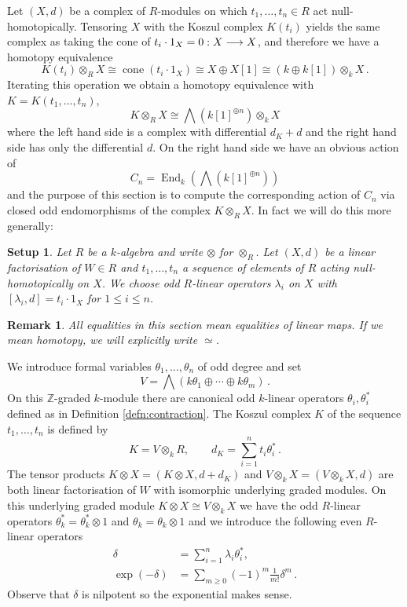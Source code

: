 \documentclass[english,letter paper,12pt,leqno]{article}
\newtheorem{setup}[theorem]{Setup}
\theoremstyle{example}
\newtheorem{remark}[theorem]{Remark}
\numberwithin{equation}{section}
\def\be{\begin{equation}}
\def\ee{\end{equation}}
\def\nZ{\mathds{Z}}
\DeclareMathOperator{\End}{End}
\begin{document}
Let $(X,d)$ be a complex of $R$-modules on which $t_1,\ldots,t_n \in R$ act null-homotopically. Tensoring $X$ with the Koszul complex $K(t_i)$ yields the same complex as taking the cone of $t_i \cdot 1_X = 0: X \longrightarrow X$, and therefore we have a homotopy equivalence
\be
K(t_i) \otimes_R X \cong \operatorname{cone}( t_i \cdot 1_X ) \cong X \oplus X[1] \cong ( k \oplus k[1] ) \otimes_k X\,.
\ee
Iterating this operation we obtain a homotopy equivalence with $K = K(t_1,\ldots,t_n)$,
\be\label{eq:cliffordactkos_1}
K \otimes_R X \cong \bigwedge( k[1]^{\oplus n} ) \otimes_k X
\ee
where the left hand side is a complex with differential $d_K + d$ and the right hand side has only the differential $d$. On the right hand side we have an obvious action of
\be
C_n = \End_k\left( \bigwedge( k[1]^{\oplus n} ) \right)
\ee
and the purpose of this section is to compute the corresponding action of $C_n$ via closed odd endomorphisms of the complex $K \otimes_R X$. In fact we will do this more generally:

\begin{setup} Let $R$ be a $k$-algebra and write $\otimes$ for $\otimes_R$. Let $(X,d)$ be a linear factorisation of $W \in R$ and $t_1,\ldots,t_n$ a sequence of elements of $R$ acting null-homotopically on $X$. We choose odd $R$-linear operators $\lambda_i$ on $X$ with $[\lambda_i, d] = t_i \cdot 1_X$ for $1 \le i \le n$.
\end{setup}

\begin{remark} All equalities in this section mean equalities of linear maps. If we mean homotopy, we will explicitly write $\simeq$.
\end{remark}

We introduce formal variables $\theta_1,\ldots,\theta_n$ of odd degree and set
\[
V = \bigwedge\left( k \theta_1 \oplus \cdots \oplus k \theta_m \right)\,.
\]
On this $\nZ$-graded $k$-module there are canonical odd $k$-linear operators $\theta_i, \theta_i^*$ defined as in Definition \ref{defn:contraction}. The Koszul complex $K$ of the sequence $t_1,\ldots,t_n$ is defined by
\begin{equation}\label{defn:koszul}
K = V \otimes_k R, \qquad d_K = \sum_{i=1}^n t_i \theta_i^*\,.
\end{equation} 
The tensor products $K \otimes X = (K \otimes X, d + d_K)$ and $V \otimes_k X = ( V \otimes_k X, d )$ are both linear factorisation of $W$ with isomorphic underlying graded modules. On this underlying graded module $K \otimes X \cong V \otimes_k X$ we have the odd $R$-linear operators $\theta_k^* = \theta_k^* \otimes 1$ and $\theta_k = \theta_k \otimes 1$ and we introduce the following even $R$-linear operators
\begin{align*}
\delta &= \sum_{i=1}^n \lambda_i \theta_i^*,\\
\exp(-\delta) &= \sum_{m \ge 0} (-1)^m \frac{1}{m!} \delta^m\,.
\end{align*}
Observe that $\delta$ is nilpotent so the exponential makes sense.
\end{document}
